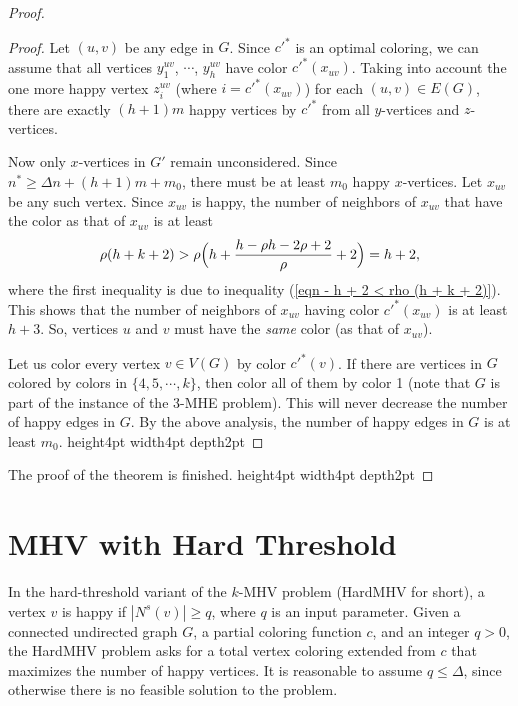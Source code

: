 \documentclass[11pt]{article}
\newcommand{\qed}{\vrule height4pt width4pt depth2pt}
\begin{document}
\begin{proof}
\begin{proof}
Let $(u, v)$ be any edge in $G$. Since $c'^*$ is an optimal coloring,
we can assume that all vertices $y_1^{uv}$, $\cdots$, $y_h^{uv}$ have
color $c'^*(x_{uv})$. Taking into account the one more happy vertex
$z_i^{uv}$ (where $i = c'^*(x_{uv})$) for each $(u, v) \in E(G)$,
there are exactly $(h + 1)m$ happy vertices by $c'^*$ from all
$y$-vertices and $z$-vertices.

Now only $x$-vertices in $G'$ remain unconsidered.
Since $n^* \geq \Delta n + (h+1)m + m_0$, there must be at least $m_0$
happy $x$-vertices. Let $x_{uv}$ be any such vertex.
Since $x_{uv}$ is happy, the number of neighbors of $x_{uv}$
that have the color as that of $x_{uv}$ is at least
\begin{equation}
\rho (h + k + 2)
> \rho \Bigl( h + \frac{h - \rho h - 2 \rho + 2}{\rho} + 2 \Bigr)
= h + 2, \nonumber
\end{equation}
where the first inequality is due to inequality
(\ref{eqn - h + 2 < rho (h + k + 2)}).
This shows that the number of neighbors of $x_{uv}$ having color
$c'^*(x_{uv})$ is at least $h + 3$. So, vertices $u$ and $v$ must have
the {\em same} color (as that of $x_{uv}$).

Let us color every vertex $v \in V(G)$ by color $c'^*(v)$.
If there are vertices in $G$ colored by colors in $\{4, 5, \cdots, k\}$,
then color all of them by color 1 (note that $G$ is part of the instance of
the 3-MHE problem). This will never decrease the number of happy edges
in $G$. By the above analysis, the number of happy edges in $G$ is
at least $m_0$.
\qed
\end{proof}

The proof of the theorem is finished.
\qed
\end{proof}




\section{MHV with Hard Threshold}
In the hard-threshold variant of the $k$-MHV problem (HardMHV for short),
a vertex $v$ is happy if $|N^s(v)| \geq q$, where $q$ is an input
parameter.
Given a connected undirected graph $G$, a partial coloring function $c$,
and an integer $q > 0$, the HardMHV problem asks for a total vertex coloring
extended from $c$ that maximizes the number of happy vertices.
It is reasonable to assume $q \leq \Delta$, since otherwise
there is no feasible solution to the problem.
\end{document}
